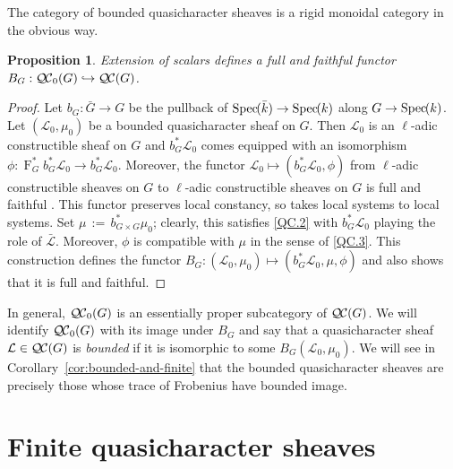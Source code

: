 \documentclass[11pt]{amsart}
\theoremstyle{plain}
\newtheorem{proposition}[theorem]{Proposition}
\theoremstyle{definition}
\theoremstyle{remark}
\newcommand{\Spec}[1]{{\operatorname{Spec}\hskip-1pt( #1 )}}
\newcommand{\EE}{\mathbb{\bar Q}_\ell}
\newcommand{\bFq}{\bar{k}}
\newcommand{\Fq}{k}
\newcommand{\Frob}[1]{\operatorname{F}_{#1}}
\newcommand{\sheafHom}{{\mathscr{H}\hskip-4pt{\it o}\hskip-2pt{\it m}}}
\newcommand{\ceq}{{\, :=\, }}
\newcommand{\qcs}[1]{{\mathcal{#1}}}
\newcommand{\gqcs}[1]{{\mathcal{\bar #1}}}
\newcommand{\QC}{{\mathcal{Q\hskip-0.8pt C}}}
\newcommand{\QCb}{{\QC_0}}
\begin{document}
The category of bounded quasicharacter sheaves is a rigid monoidal category in the obvious way. 

\begin{proposition}\label{prop:BG}
Extension of scalars defines a full and faithful functor 
$B_G : \QCb(G) \hookrightarrow \QC(G)$.
\end{proposition}

\begin{proof}
 Let $b_G : {\bar G} \to G$ be the pullback of $\Spec{\bFq} \to \Spec{\Fq}$ along $G\to \Spec{\Fq}$.
 Let $(\qcs{L}_0,\mu_0)$ be a bounded quasicharacter sheaf on $G$. 
 Then $\qcs{L}_0$ is an $\ell$-adic constructible sheaf on $G$ and
 $b_G^* \qcs{L}_0$ comes equipped with an isomorphism 
 $\phi : \Frob{G}^* b_G^*\qcs{L}_0 \to b_G^* \qcs{L}_0$.
 Moreover, the functor $\qcs{L}_0 \mapsto (b_G^* \qcs{L}_0,\phi)$  
 from $\ell$-adic constructible sheaves on $G$ to $\ell$-adic constructible sheaves on $G$
 is full and faithful . 
 This functor preserves local constancy, so takes local systems to local systems. 
 Set $\mu \ceq b_{G\times G}^*\mu_0$; clearly, this satisfies \ref{QC.2} 
 with $b_G^*\qcs{L}_0$ playing the role of $\gqcs{L}$.
 Moreover, $\phi$ is compatible with $\mu$ in the sense of \ref{QC.3}.
 This construction defines the functor $B_G : (\qcs{L}_0,\mu_0) \mapsto (b_G^*\qcs{L}_0,\mu, \phi)$
 and also shows that it is full and faithful.
\end{proof}

In general, $\QCb(G)$ is an essentially
proper subcategory of $\QC(G)$. We will identify $\QCb(G)$ with its image under $B_G$
and say that a quasicharacter sheaf $\qcs{L} \in \QC(G)$ is \emph{bounded}
if it is isomorphic to some $B_G(\qcs{L}_0, \mu_0)$.
We will see in Corollary~\ref{cor:bounded-and-finite} that the bounded quasicharacter sheaves
are precisely those whose trace of Frobenius have bounded image.

\section{Finite quasicharacter sheaves}\label{sec:finite}

 
\end{document}
